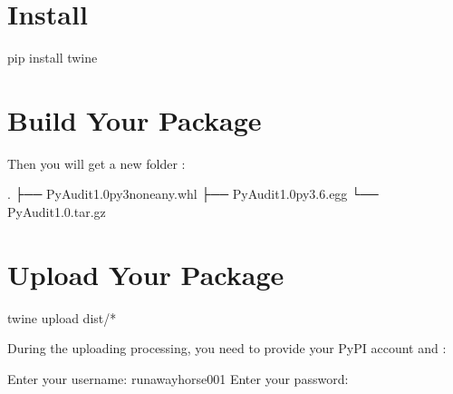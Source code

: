 \documentclass[letterpaper,12pt,english]{sphinxmanual}
\begin{document}
\section{Install }
\label{\detokenize{pypi:install-twine}}
%
\begin{sphinxVerbatim}[commandchars=\\\{\}]
pip install twine
\end{sphinxVerbatim}


\section{Build Your Package}
\label{\detokenize{pypi:build-your-package}}
%
\begin{sphinxVerbatim}[commandchars=\\\{\}]
   
\end{sphinxVerbatim}

Then you will get a new folder :

%
\begin{sphinxVerbatim}[commandchars=\\\{\}]
.
├── PyAudit\PYGZhy{}1.0\PYGZhy{}py3\PYGZhy{}none\PYGZhy{}any.whl
├── PyAudit\PYGZhy{}1.0\PYGZhy{}py3.6.egg
└── PyAudit\PYGZhy{}1.0.tar.gz
\end{sphinxVerbatim}


\section{Upload Your Package}
\label{\detokenize{pypi:upload-your-package}}
%
\begin{sphinxVerbatim}[commandchars=\\\{\}]
twine upload dist/*
\end{sphinxVerbatim}

During the uploading processing, you need to provide your PyPI account  and :

%
\begin{sphinxVerbatim}[commandchars=\\\{\}]
Enter your username: runawayhorse001
Enter your password:
\end{sphinxVerbatim}
\end{document}
